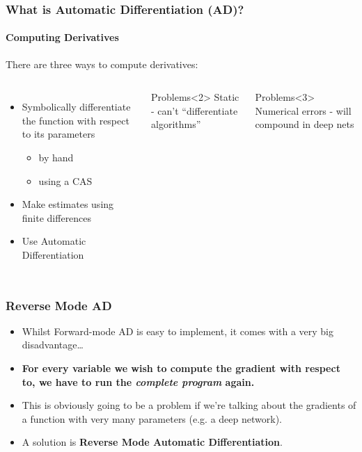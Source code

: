 \documentclass[]{article}
\begin{document}
\begin{frame}
	\frametitle{What is Automatic Differentiation (AD)?}
	\framesubtitle{Computing Derivatives}
There are three ways to compute derivatives:

\begin{columns}
    \begin{itemize}
    	\item<1,2> Symbolically differentiate the function with respect to its parameters
    	\begin{itemize}
    		\item by hand
    		\item using a CAS
    	\end{itemize}
    	\item<1,3> Make estimates using finite differences
    	\item<1,4> Use Automatic Differentiation
    \end{itemize}

      \begin{block}{Problems}<2>
        Static - can't ``differentiate algorithms''
      \end{block}
      \begin{block}{Problems}<3>
        Numerical errors - will compound in deep nets
      \end{block}
  \end{columns}
\end{frame}

\begin{frame}
\frametitle{Reverse Mode AD}
\begin{itemize}
	\item<+-> Whilst Forward-mode AD is easy to implement, it comes with a very big disadvantage\ldots
	\item<+-> \textbf{For every variable we wish to compute the gradient with respect to, we have to run the \emph{complete program} again.}
	\item<+-> This is obviously going to be a problem if we're talking about the gradients of a function with very many parameters (e.g. a deep network).
	\item<+-> A solution is \textbf{Reverse Mode Automatic Differentiation}. 
\end{itemize}
\end{frame}
\end{document}
